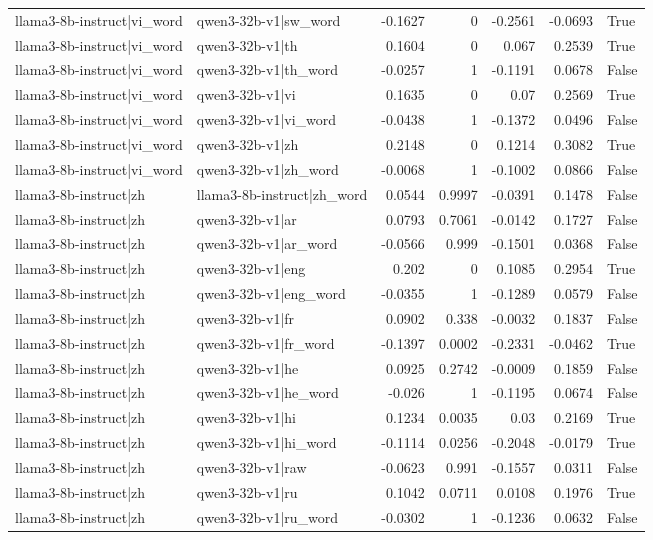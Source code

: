 \begin{table}
\begin{tabular}{l l r r r r l}
llama3-8b-instruct|vi_word & qwen3-32b-v1|sw_word & -0.1627 & 0 & -0.2561 & -0.0693 & True \\
llama3-8b-instruct|vi_word & qwen3-32b-v1|th & 0.1604 & 0 & 0.067 & 0.2539 & True \\
llama3-8b-instruct|vi_word & qwen3-32b-v1|th_word & -0.0257 & 1 & -0.1191 & 0.0678 & False \\
llama3-8b-instruct|vi_word & qwen3-32b-v1|vi & 0.1635 & 0 & 0.07 & 0.2569 & True \\
llama3-8b-instruct|vi_word & qwen3-32b-v1|vi_word & -0.0438 & 1 & -0.1372 & 0.0496 & False \\
llama3-8b-instruct|vi_word & qwen3-32b-v1|zh & 0.2148 & 0 & 0.1214 & 0.3082 & True \\
llama3-8b-instruct|vi_word & qwen3-32b-v1|zh_word & -0.0068 & 1 & -0.1002 & 0.0866 & False \\
llama3-8b-instruct|zh & llama3-8b-instruct|zh_word & 0.0544 & 0.9997 & -0.0391 & 0.1478 & False \\
llama3-8b-instruct|zh & qwen3-32b-v1|ar & 0.0793 & 0.7061 & -0.0142 & 0.1727 & False \\
llama3-8b-instruct|zh & qwen3-32b-v1|ar_word & -0.0566 & 0.999 & -0.1501 & 0.0368 & False \\
llama3-8b-instruct|zh & qwen3-32b-v1|eng & 0.202 & 0 & 0.1085 & 0.2954 & True \\
llama3-8b-instruct|zh & qwen3-32b-v1|eng_word & -0.0355 & 1 & -0.1289 & 0.0579 & False \\
llama3-8b-instruct|zh & qwen3-32b-v1|fr & 0.0902 & 0.338 & -0.0032 & 0.1837 & False \\
llama3-8b-instruct|zh & qwen3-32b-v1|fr_word & -0.1397 & 0.0002 & -0.2331 & -0.0462 & True \\
llama3-8b-instruct|zh & qwen3-32b-v1|he & 0.0925 & 0.2742 & -0.0009 & 0.1859 & False \\
llama3-8b-instruct|zh & qwen3-32b-v1|he_word & -0.026 & 1 & -0.1195 & 0.0674 & False \\
llama3-8b-instruct|zh & qwen3-32b-v1|hi & 0.1234 & 0.0035 & 0.03 & 0.2169 & True \\
llama3-8b-instruct|zh & qwen3-32b-v1|hi_word & -0.1114 & 0.0256 & -0.2048 & -0.0179 & True \\
llama3-8b-instruct|zh & qwen3-32b-v1|raw & -0.0623 & 0.991 & -0.1557 & 0.0311 & False \\
llama3-8b-instruct|zh & qwen3-32b-v1|ru & 0.1042 & 0.0711 & 0.0108 & 0.1976 & True \\
llama3-8b-instruct|zh & qwen3-32b-v1|ru_word & -0.0302 & 1 & -0.1236 & 0.0632 & False \\

\end{tabular}
\end{table}
